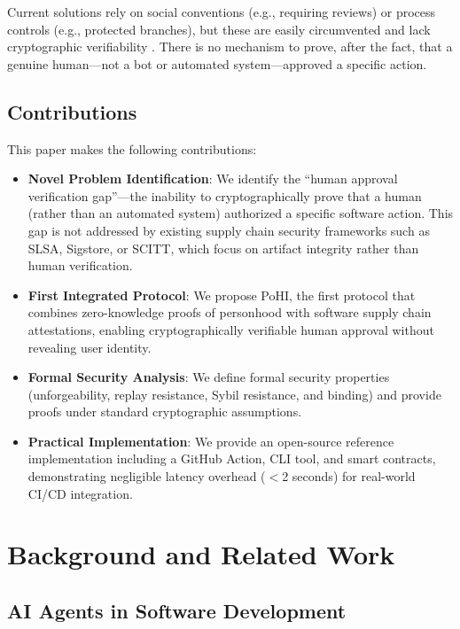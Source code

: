 \documentclass[conference]{IEEEtran}
\begin{document}
Current solutions rely on social conventions (e.g., requiring reviews) or process controls (e.g., protected branches), but these are easily circumvented and lack cryptographic verifiability \cite{supplychain}. There is no mechanism to prove, after the fact, that a genuine human—not a bot or automated system—approved a specific action.

\subsection{Contributions}

This paper makes the following contributions:
\begin{itemize}
    \item \textbf{Novel Problem Identification}: We identify the ``human approval verification gap''---the inability to cryptographically prove that a human (rather than an automated system) authorized a specific software action. This gap is not addressed by existing supply chain security frameworks such as SLSA, Sigstore, or SCITT, which focus on artifact integrity rather than human verification.
    \item \textbf{First Integrated Protocol}: We propose PoHI, the first protocol that combines zero-knowledge proofs of personhood with software supply chain attestations, enabling cryptographically verifiable human approval without revealing user identity.
    \item \textbf{Formal Security Analysis}: We define formal security properties (unforgeability, replay resistance, Sybil resistance, and binding) and provide proofs under standard cryptographic assumptions.
    \item \textbf{Practical Implementation}: We provide an open-source reference implementation including a GitHub Action, CLI tool, and smart contracts, demonstrating negligible latency overhead ($<$2 seconds) for real-world CI/CD integration.
\end{itemize}

\section{Background and Related Work}

\subsection{AI Agents in Software Development}
\end{document}
